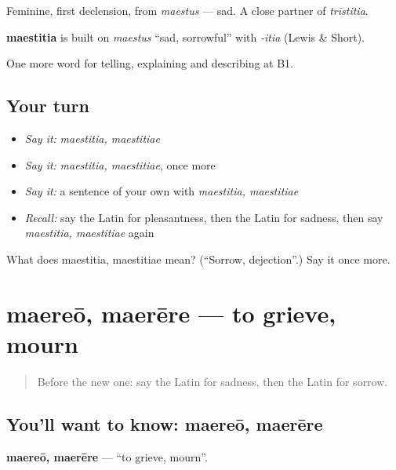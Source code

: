 Feminine, first declension, from \emph{maestus} — sad. A close partner of \emph{trīstitia}.

\begin{cousinweb}
\textbf{maestitia} is built on \emph{maestus} \textquotedblleft{}sad, sorrowful\textquotedblright{} with \emph{-itia} (Lewis \& Short).
\end{cousinweb}

\begin{grammarlens}[title={What you've built}]
One more word for telling, explaining and describing at B1.
\end{grammarlens}

\subsection*{Your turn}
\begin{itemize}
\raggedright
  \item \emph{Say it:} \emph{maestitia, maestitiae}
  \item \emph{Say it:} \emph{maestitia, maestitiae}, once more
  \item \emph{Say it:} a sentence of your own with \emph{maestitia, maestitiae}
  \item \emph{Recall:} say the Latin for pleasantness, then the Latin for sadness, then say \emph{maestitia, maestitiae} again
\end{itemize}

\begin{tcolorbox}[breakable,colback=teal!4,colframe=teal!35!black,title={Before you move on}]
What does maestitia, maestitiae mean? (\textquotedblleft{}Sorrow, dejection\textquotedblright{}.) Say it once more.
\end{tcolorbox}
\section[maereō, maerēre]{maereō, maerēre — to grieve, mourn}

\label{lesson:LA-C490-maereo}



\begin{quote}
Before the new one: say the Latin for sadness, then the Latin for sorrow.
\end{quote}

\subsection*{You'll want to know: maereō, maerēre}
\textbf{maereō, maerēre} — \textquotedblleft{}to grieve, mourn\textquotedblright{}.

